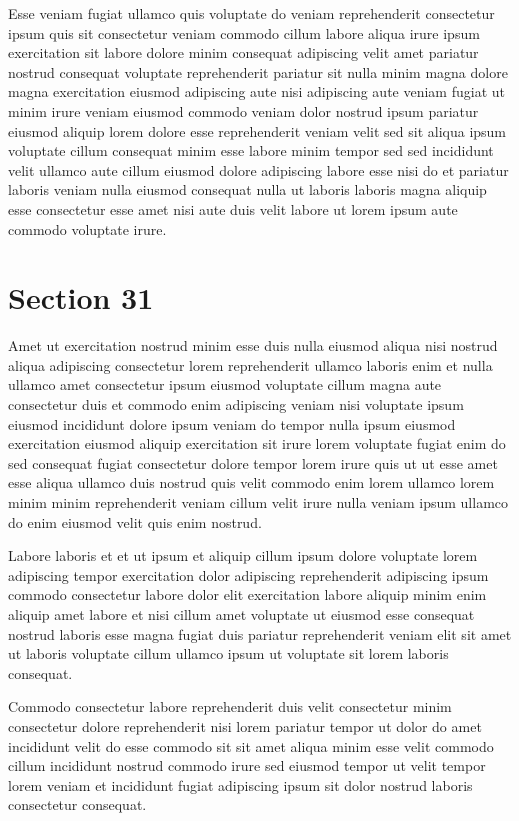 \documentclass{article}
\begin{document}
Esse veniam fugiat ullamco quis voluptate do veniam reprehenderit consectetur ipsum quis sit consectetur veniam commodo cillum labore aliqua irure ipsum exercitation sit labore dolore minim consequat adipiscing velit amet pariatur nostrud consequat voluptate reprehenderit pariatur sit nulla minim magna dolore magna exercitation eiusmod adipiscing aute nisi adipiscing aute veniam fugiat ut minim irure veniam eiusmod commodo veniam dolor nostrud ipsum pariatur eiusmod aliquip lorem dolore esse reprehenderit veniam velit sed sit aliqua ipsum voluptate cillum consequat minim esse labore minim tempor sed sed incididunt velit ullamco aute cillum eiusmod dolore adipiscing labore esse nisi do et pariatur laboris veniam nulla eiusmod consequat nulla ut laboris laboris magna aliquip esse consectetur esse amet nisi aute duis velit labore ut lorem ipsum aute commodo voluptate irure.

\section{Section 31}
Amet ut exercitation nostrud minim esse duis nulla eiusmod aliqua nisi nostrud aliqua adipiscing consectetur lorem reprehenderit ullamco laboris enim et nulla ullamco amet consectetur ipsum eiusmod voluptate cillum magna aute consectetur duis et commodo enim adipiscing veniam nisi voluptate ipsum eiusmod incididunt dolore ipsum veniam do tempor nulla ipsum eiusmod exercitation eiusmod aliquip exercitation sit irure lorem voluptate fugiat enim do sed consequat fugiat consectetur dolore tempor lorem irure quis ut ut esse amet esse aliqua ullamco duis nostrud quis velit commodo enim lorem ullamco lorem minim minim reprehenderit veniam cillum velit irure nulla veniam ipsum ullamco do enim eiusmod velit quis enim nostrud.

Labore laboris et et ut ipsum et aliquip cillum ipsum dolore voluptate lorem adipiscing tempor exercitation dolor adipiscing reprehenderit adipiscing ipsum commodo consectetur labore dolor elit exercitation labore aliquip minim enim aliquip amet labore et nisi cillum amet voluptate ut eiusmod esse consequat nostrud laboris esse magna fugiat duis pariatur reprehenderit veniam elit sit amet ut laboris voluptate cillum ullamco ipsum ut voluptate sit lorem laboris consequat.

Commodo consectetur labore reprehenderit duis velit consectetur minim consectetur dolore reprehenderit nisi lorem pariatur tempor ut dolor do amet incididunt velit do esse commodo sit sit amet aliqua minim esse velit commodo cillum incididunt nostrud commodo irure sed eiusmod tempor ut velit tempor lorem veniam et incididunt fugiat adipiscing ipsum sit dolor nostrud laboris consectetur consequat.
\end{document}
